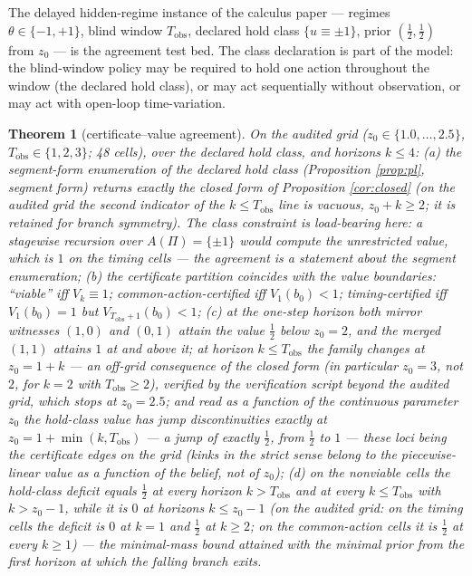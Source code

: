 \documentclass[10pt,twocolumn]{article}
\theoremstyle{plain}
\newtheorem{theorem}{Theorem}
\theoremstyle{definition}
\theoremstyle{remark}
\begin{document}
The delayed hidden-regime instance of the calculus paper --- regimes
\(\theta \in \{-1, +1\}\), blind window \(T_{\mathrm{obs}}\), declared
hold class \(\{u \equiv \pm 1\}\), prior \((\tfrac12, \tfrac12)\) from
\(z_{0}\) --- is the agreement test bed. The class declaration is part of
the model: the blind-window policy may be required to hold one action
throughout the window (the declared hold class), or may act sequentially
without observation, or may act with open-loop time-variation.

\begin{theorem}[certificate--value agreement]\label{thm:agree}
On the audited grid (\(z_{0} \in \{1.0, \dots, 2.5\}\),
\(T_{\mathrm{obs}} \in \{1,2,3\}\); 48 cells), over the declared hold
class, and horizons \(k \le 4\):
(a) the segment-form enumeration of the declared hold class
(Proposition \ref{prop:pl}, segment form) returns exactly the closed
form of Proposition
\ref{cor:closed} (on the audited grid the second indicator of the
\(k \le T_{\mathrm{obs}}\) line is vacuous, \(z_{0} + k \ge 2\); it is
retained for branch symmetry). The class constraint is load-bearing
here: a stagewise recursion over \(A(\Pi) = \{\pm 1\}\) would compute
the unrestricted value, which is \(1\) on the timing cells --- the
agreement is a statement about the segment enumeration;
(b) the certificate partition coincides with the value boundaries:
``viable'' iff \(V_{k} \equiv 1\); common-action-certified iff
\(V_{1}(b_{0}) < 1\); timing-certified iff \(V_{1}(b_{0}) = 1\) but
\(V_{T_{\mathrm{obs}}+1}(b_{0}) < 1\);
(c) at the one-step horizon both mirror witnesses \((1,0)\) and
\((0,1)\) attain the value \(\tfrac{1}{2}\) below \(z_{0} = 2\), and
the merged \((1,1)\) attains \(1\) at and above it; at horizon
\(k \le T_{\mathrm{obs}}\) the family changes at \(z_{0} = 1 + k\) ---
an off-grid consequence of the closed form (in particular \(z_{0} = 3\),
not \(2\), for \(k = 2\) with \(T_{\mathrm{obs}} \ge 2\)), verified
by the verification script beyond the audited grid, which stops at
\(z_{0} = 2.5\); and read as a function of
the continuous parameter \(z_{0}\) the hold-class value has jump
discontinuities exactly at \(z_{0} = 1 + \min(k, T_{\mathrm{obs}})\) --- a
jump of exactly \(\tfrac{1}{2}\), from \(\tfrac{1}{2}\) to \(1\) --- these
loci being the certificate edges on the grid (kinks in the strict sense
belong to the piecewise-linear value as a function of the belief, not of
\(z_{0}\));
(d) on the nonviable cells the hold-class deficit equals
\(\tfrac{1}{2}\) at every horizon \(k > T_{\mathrm{obs}}\) and at
every \(k \le T_{\mathrm{obs}}\) with \(k > z_{0} - 1\), while it is
\(0\) at horizons \(k \le z_{0} - 1\) (on the audited grid: on the
timing cells the deficit is \(0\) at \(k = 1\) and \(\tfrac{1}{2}\)
at \(k \ge 2\); on the common-action cells it is \(\tfrac{1}{2}\) at
every \(k \ge 1\)) --- the minimal-mass bound attained with the
minimal prior from the first horizon at which the falling branch
exits.
\end{theorem}
\end{document}

